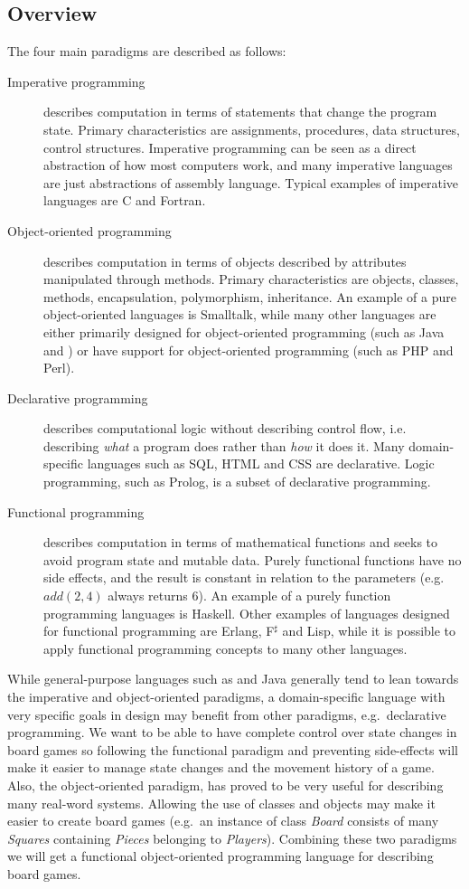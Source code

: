\subsection{Overview}
The four main paradigms are described as follows:\cite{fourparadigms}
\begin{description}
\item[Imperative programming] describes computation in terms of statements that
  change the program state. Primary characteristics are assignments, procedures,
  data structures, control structures. Imperative programming can be seen as a
  direct abstraction of how most computers work, and many imperative languages
  are just abstractions of assembly language. Typical examples of imperative
  languages are C and Fortran.
\item[Object-oriented programming] describes computation in terms of objects
  described by attributes manipulated through methods. Primary characteristics
  are objects, classes, methods, encapsulation, polymorphism, inheritance. An
  example of a pure object-oriented languages is Smalltalk, while many other
  languages are either primarily designed for object-oriented programming (such
  as Java and \CS{}) or have support for object-oriented programming (such as PHP
  and Perl).
\item[Declarative programming] describes computational logic without describing
  control flow, i.e. describing {\em what} a program does rather than {\em how}
  it does it. Many domain-specific languages such as SQL, HTML and CSS are
  declarative. Logic programming, such as Prolog, is a subset of declarative
  programming.
\item[Functional programming] describes computation in terms of mathematical
  functions and seeks to avoid program state and mutable data. Purely functional
  functions have no side effects, and the result is constant in relation to the
  parameters (e.g. $add(2, 4)$ always returns $6$). An example of a purely
  function programming languages is Haskell. Other examples of languages
  designed for functional programming are Erlang, F$^\sharp$ and Lisp, while it is
  possible to apply functional programming concepts to many other languages.
\end{description}


While general-purpose languages such as \CS{} and Java generally tend to lean
towards the imperative and object-oriented paradigms, a domain-specific
language with very specific goals in design may benefit from other paradigms,
e.g.\ declarative programming. We want to be able to have complete control
over state changes in board games so following the functional paradigm
and preventing side-effects will make it easier to manage state changes
and the movement history of a game. Also, the object-oriented paradigm,
has proved to be very useful for describing many real-word systems. Allowing
the use of classes and objects may make it easier to create board games
(e.g.\ an instance of class \emph{Board} consists of many \emph{Squares} 
containing \emph{Pieces} belonging to \emph{Players}). Combining these two
paradigms we will get a functional object-oriented programming language
for describing board games.

